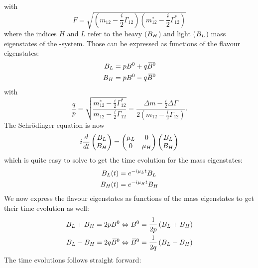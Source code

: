 with
\begin{equation}
    F = \sqrt{\left(m_{12}-\frac{i}{2}\Gamma_{12}\right)\left(m_{12}^*-\frac{i}{2}\Gamma_{12}^*\right)}
\end{equation}
where the indices $H$ and $L$ refer to the heavy ($B_H$) and light ($B_L$) mass eigenstates of the \B-system. Those can be expressed as functions
of the flavour eigenstates:
\begin{align}
    B_L &= pB^0 + q \kern 0.18em\overline{\kern -0.18em B}{}^0\\
    B_H &= pB^0 - q \kern 0.18em\overline{\kern -0.18em B}{}^0
\end{align}
with
\begin{equation}
    \frac{q}{p} = \sqrt{\frac{m_{12}^*-\frac{i}{2}\Gamma_{12}^*}{m_{12}-\frac{i}{2}\Gamma_{12}}}
    = \frac{\Delta m-\frac{i}{2}\Delta\Gamma}{2\left(m_{12}-\frac{i}{2}\Gamma_{12}\right)}.
\end{equation}
The Schrödinger equation is now
\begin{equation}
    i\frac{d}{dt}\begin{pmatrix} B_L \\ B_H \end{pmatrix} = \begin{pmatrix} \mu_L & 0 \\ 0 & \mu_H \end{pmatrix}
    \begin{pmatrix} B_L \\ B_H \end{pmatrix}
\end{equation}
which is quite easy to solve to get the time evolution for the mass eigenstates:
\begin{align}
    B_L(t) &= e^{-i\mu_Lt}B_L\\
    B_H(t) &= e^{-i\mu_Ht}B_H
\end{align}
We now express the flavour eigenstates as functions of the mass eigenstates to get their time evolution as well:
\begin{align}
    B_L+B_H = 2pB^0 &\Leftrightarrow B^0 = \frac{1}{2p}\left(B_L + B_H\right)\\
    B_L-B_H = 2q\kern 0.18em\overline{\kern -0.18em B}{}^0 &\Leftrightarrow \kern 0.18em\overline{\kern -0.18em B}{}^0 = \frac{1}{2q}\left(B_L - B_H\right)
\end{align}
The time evolutions follows straight forward:
